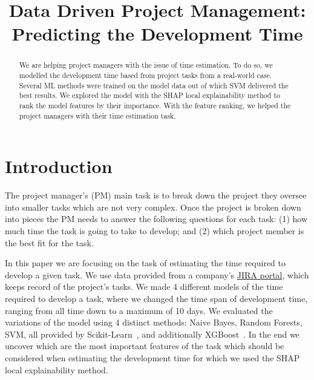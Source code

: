\documentclass[conference,compsoc]{IEEEtran}
\begin{document}
\title{Data Driven Project Management: \\ Predicting the Development Time}


\author{
}

\maketitle

\begin{abstract}
We are helping project managers with the issue of time estimation. To do so, we modelled the development time based from project tasks from a real-world case. Several ML methods were trained on the model data out of which SVM delivered the best results. We explored the model with the SHAP local explainability method to rank the model features by their importance. With the feature ranking, we helped the project managers with their time estimation task.
\end{abstract}

\section{Introduction}

The project manager's (PM) main task is to break down the project they oversee into smaller tasks which are not very complex. Once the project is broken down into pieces the PM needs to answer the following questions for each task: (1) how much time the task is going to take to develop; and (2) which project member is the best fit for the task.

In this paper we are focusing on the task of estimating the time required to develop a given task. We use data provided from a company's \href{https://www.atlassian.com/software/jira}{JIRA portal}, which keeps record of the project's tasks. We made 4 different models of the time required to develop a task, where we changed the time span of development time, ranging from all time down to a maximum of 10 days. We evaluated the variations of the model using 4 distinct methods: Naive Bayes, Random Forests, SVM, all provided by Scikit-Learn~\cite{scikit-learn}, and additionally XGBoost~\cite{chen2016xgboost}. In the end we uncover which are the most important features of the task which should be considered when estimating the development time for which we used the SHAP~\cite{lundberg2020local2global} local explainability method.
\end{document}

